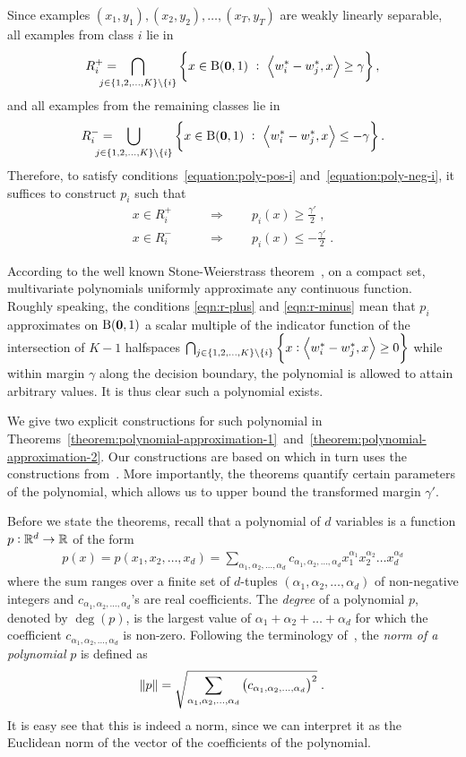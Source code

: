 Since examples $(x_1,y_1), (x_2, y_2), \dots, (x_T,y_T)$ are weakly linearly separable,
all examples from class $i$ lie in
$$
R_i^+ = \!\!\!\!\! \!\!\!\!\! \bigcap_{j \in \cbr{1,2,\dots,K} \setminus \cbr{i}} \cbr{x \in \B(\zero,1) ~:~ \ip{w_i^* - w_j^*}{x} \ge \gamma},
$$
and all examples from the remaining classes lie in
$$
R_i^- = \!\!\!\!\! \!\!\!\!\! \bigcup_{j \in \cbr{1,2,\dots,K} \setminus \cbr{i}} \cbr{x \in \B(\zero,1) ~:~ \ip{w_i^* - w_j^*}{x} \le -\gamma}.
$$
Therefore, to satisfy conditions~\eqref{equation:poly-pos-i}
and~\eqref{equation:poly-neg-i}, it suffices to construct $p_i$ such that
\begin{align}
\label{eqn:r-plus}
x \in R_i^+ \qquad & \Longrightarrow \qquad p_i(x) \ge \frac {\gamma'} 2 \; , \\
\label{eqn:r-minus}
x \in R_i^- \qquad & \Longrightarrow \qquad p_i(x) \le - \frac {\gamma'} 2 \; .
\end{align}

According to the well known Stone-Weierstrass theorem~\citep[see
e.g.][Section~10.10]{Davidson-Donsig-2010}, on a compact set, multivariate
polynomials uniformly approximate any continuous function. Roughly speaking, the
conditions \eqref{eqn:r-plus} and \eqref{eqn:r-minus} mean that $p_i$
approximates on $\operatorname{B}(\mathbf{0},1)$ a scalar multiple of the indicator function of the
intersection of $K-1$ halfspaces $\bigcap_{j \in \cbr{1,2,\dots,K} \setminus
\cbr{i}} \cbr{x: \ip{w_i^* - w_j^*}{x} \geq 0}$ while within margin $\gamma$ along
the decision boundary, the polynomial is allowed to attain arbitrary values.
It is thus clear such a polynomial exists.

We give two explicit constructions for such polynomial in
Theorems~\ref{theorem:polynomial-approximation-1}~and~\ref{theorem:polynomial-approximation-2}.
Our constructions are based on \citet{Klivans-Servedio-2008} which in turn uses
the constructions from~\citet{Beigel-Reingold-Spielman-1995}. More importantly,
the theorems quantify certain parameters of the polynomial, which allows us
to upper bound the transformed margin $\gamma'$.

Before we state the theorems, recall that a polynomial of $d$ variables is a
function $p:\mathbb{R}^d \to \mathbb{R}$ of the form
\begin{align*}
p(x)
 = p(x_1, x_2, \dots, x_d) = \sum_{\alpha_1, \alpha_2, \dots, \alpha_d} c_{\alpha_1, \alpha_2, \dots, \alpha_d} x_1^{\alpha_1} x_2^{\alpha_2} \dots x_d^{\alpha_d}
\end{align*}
where the sum ranges over a finite set of $d$-tuples $(\alpha_1, \alpha_2,
\dots, \alpha_d)$ of non-negative integers and $c_{\alpha_1, \alpha_2, \dots,
\alpha_d}$'s are real coefficients. The \emph{degree} of a polynomial $p$,
denoted by $\deg(p)$, is the largest value of $\alpha_1 + \alpha_2 + \dots +
\alpha_d$ for which the coefficient $c_{\alpha_1, \alpha_2, \dots, \alpha_d}$ is
non-zero. Following the terminology of~\citet{Klivans-Servedio-2008}, the
\emph{norm of a polynomial} $p$ is defined as
$$
\norm{p} = \sqrt{\sum_{\alpha_1, \alpha_2, \dots, \alpha_d} \left(c_{\alpha_1, \alpha_2, \dots, \alpha_d} \right)^2 } \; .
$$
It is easy see that this is indeed a norm, since we can interpret it as the
Euclidean norm of the vector of the coefficients of the polynomial.

